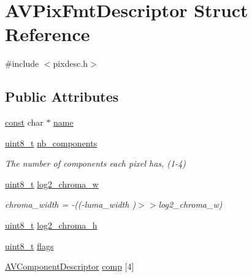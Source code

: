 \hypertarget{struct_a_v_pix_fmt_descriptor}{}\section{A\+V\+Pix\+Fmt\+Descriptor Struct Reference}
\label{struct_a_v_pix_fmt_descriptor}


{\ttfamily \#include $<$pixdesc.\+h$>$}

\subsection*{Public Attributes}
\begin{DoxyCompactItemize}
\item 
\hyperlink{getopt1_8c_a2c212835823e3c54a8ab6d95c652660e}{const} char $\ast$ \hyperlink{struct_a_v_pix_fmt_descriptor_a10736c3f1288eb87b23ede3ffdefb435}{name}
\item 
\hyperlink{lib-src_2ffmpeg_2win32_2stdint_8h_a9a941819355e6f658991890ff66b4b0e}{uint8\+\_\+t} \hyperlink{struct_a_v_pix_fmt_descriptor_ae83de203f97288c9f4070212a5eac5de}{nb\+\_\+components}
\begin{DoxyCompactList}\small\item\em The number of components each pixel has, (1-\/4) \end{DoxyCompactList}\item 
\hyperlink{lib-src_2ffmpeg_2win32_2stdint_8h_a9a941819355e6f658991890ff66b4b0e}{uint8\+\_\+t} \hyperlink{struct_a_v_pix_fmt_descriptor_a4abca4534188ff94627e88c0d8362058}{log2\+\_\+chroma\+\_\+w}
\begin{DoxyCompactList}\small\item\em chroma\+\_\+width = -\/((-\/luma\+\_\+width )$>$$>$log2\+\_\+chroma\+\_\+w) \end{DoxyCompactList}\item 
\hyperlink{lib-src_2ffmpeg_2win32_2stdint_8h_a9a941819355e6f658991890ff66b4b0e}{uint8\+\_\+t} \hyperlink{struct_a_v_pix_fmt_descriptor_abea8ed308fe00644fc066a00018afa95}{log2\+\_\+chroma\+\_\+h}
\item 
\hyperlink{lib-src_2ffmpeg_2win32_2stdint_8h_a9a941819355e6f658991890ff66b4b0e}{uint8\+\_\+t} \hyperlink{struct_a_v_pix_fmt_descriptor_a6da04fdde7dcfd348dede45c6a68c229}{flags}
\item 
\hyperlink{struct_a_v_component_descriptor}{A\+V\+Component\+Descriptor} \hyperlink{struct_a_v_pix_fmt_descriptor_a17569c9349766c3b5201b33f84f19a25}{comp} \mbox{[}4\mbox{]}
\end{DoxyCompactItemize}


